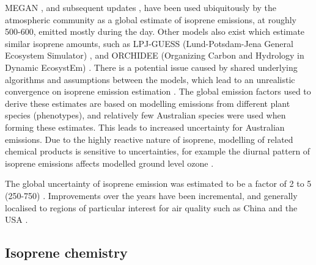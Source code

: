     MEGAN \parencite{Guenther1995}, and subsequent updates 
    \parencite{Guenther2000,Guenther2006,Guenther2012}, have been used 
    ubiquitously by the atmospheric community as a global estimate of isoprene 
    emissions, at roughly 500-600\tgpyr, emitted mostly during the day.
    Other models also exist which estimate similar isoprene amounts, such as 
    LPJ-GUESS (Lund-Potsdam-Jena General Ecosystem Simulator) 
    \parencite{Arneth2007}, and ORCHIDEE (Organizing Carbon and Hydrology in 
    Dynamic EcosystEm) \parencite{Messina2016}.
    There is a potential issue caused by shared underlying algorithms and 
    assumptions between the models, which lead to an unrealistic convergence on 
    isoprene emission estimation \parencite{Arneth2008}.
    The global emission factors used to derive these estimates are based on 
    modelling emissions from different plant species (phenotypes), and 
    relatively few Australian species were used when forming these estimates.
    This leads to increased uncertainty for Australian emissions.
    Due to the highly reactive nature of isoprene, modelling of related 
    chemical products is sensitive to uncertainties, for example the diurnal 
    pattern of isoprene emissions affects modelled ground level ozone 
    \parencite{Hewitt2011, Fan2004}.
    
    The global uncertainty of isoprene emission was estimated to be a factor of 2 to 5 (250-750\tgpyr) \parencite{Kanakidou2005}.
    Improvements over the years have been incremental, and generally localised to regions of particular interest for air quality such as China and the USA \parencite{Guenther2012,Jiang2018}.
    
  \subsection{Isoprene chemistry}
    \label{LR:VOCs:IsopCascade}
    
